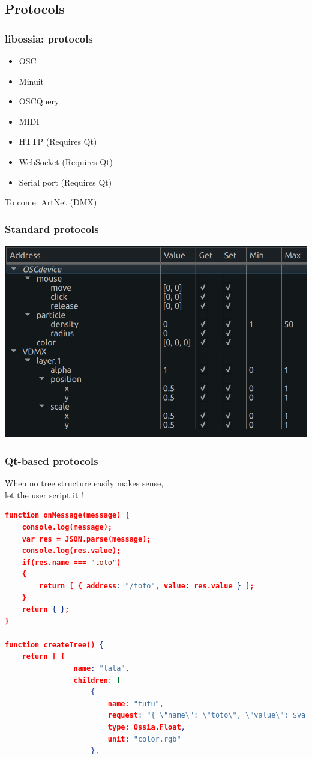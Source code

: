 \documentclass[handout]{beamer}
\begin{document}
\subsection{Protocols}
\begin{frame}
\frametitle{libossia: protocols}
\Large
\begin{itemize}
    \item{OSC}
    \item{Minuit}
    \item{OSCQuery}
    \item{MIDI}
    \item{HTTP (Requires Qt)}
    \item{WebSocket (Requires Qt)}
    \item{Serial port (Requires Qt)}
\end{itemize}

To come: ArtNet (DMX)
\end{frame}

\begin{frame}
\frametitle{Standard protocols}
\Large

\includegraphics[width=\textwidth]{images/tree.png}
\end{frame}


\begin{frame}[fragile]
\frametitle{Qt-based protocols}
\Large
When no tree structure easily makes sense,~\\let the user script it !
\footnotesize
\begin{lstlisting}[language=json]
function onMessage(message) {
    console.log(message);
    var res = JSON.parse(message);
    console.log(res.value);
    if(res.name === "toto")
    {
        return [ { address: "/toto", value: res.value } ];
    }
    return { };
}

function createTree() {
    return [ {
                name: "tata",
                children: [
                    {
                        name: "tutu",
                        request: "{ \"name\": \"toto\", \"value\": $val }",
                        type: Ossia.Float,
                        unit: "color.rgb"
                    },
\end{lstlisting}
\end{frame}
\end{document}
